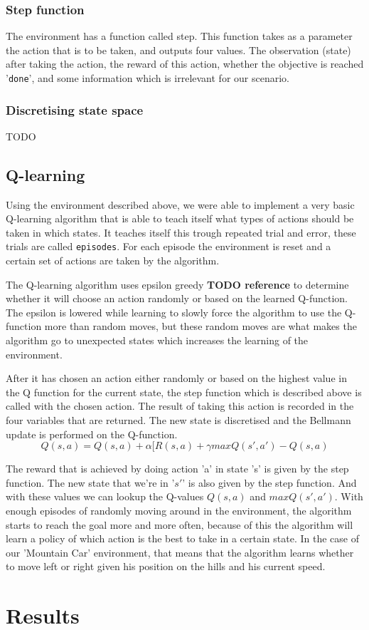 \documentclass{article}
\begin{document}
\subsubsection{Step function}
The environment has a function called step. This function takes as a parameter the action that is to be taken, and outputs four values. The observation (state) after taking the action, the reward of this action, whether the objective is reached '\texttt{done}', and some information which is irrelevant for our scenario. 
\subsubsection{Discretising state space}
TODO 

\subsection{Q-learning}
Using the environment described above, we were able to implement a very basic Q-learning algorithm that is able to teach itself what types of actions should be taken in which states. 
It teaches itself this trough repeated trial and error, these trials are called \texttt{episodes}. For each episode the environment is reset and a certain set of actions are taken by the algorithm. 

The Q-learning algorithm uses epsilon greedy \textbf{TODO reference} to determine whether it will choose an action randomly or based on the learned Q-function. The epsilon is lowered while learning to slowly force the algorithm to use the Q-function more than random moves, but these random moves are what makes the algorithm go to unexpected states which increases the learning of the environment. 

After it has chosen an action either randomly or based on the highest value in the Q function for the current state, the step function which is described above is called with the chosen action. The result of taking this action is recorded in the four variables that are returned. The new state is discretised and the Bellmann update is performed on the Q-function. 
\begin{displaymath}
  Q(s, a) = Q(s,a) + \alpha[R(s,a) + \gamma max Q(s', a') - Q(s, a)
\end{displaymath}

The reward that is achieved by doing action 'a' in state 's' is given by the step function. The new state that we're in '$s'$' is also given by the step function. And with these values we can lookup the Q-values $Q(s, a)$ and $max Q(s', a')$. 
With enough episodes of randomly moving around in the environment, the algorithm starts to reach the goal more and more often, because of this the algorithm will learn a policy of which action is the best to take in a certain state. In the case of our 'Mountain Car' environment, that means that the algorithm learns whether to move left or right given his position on the hills and his current speed.


\section{Results}
\end{document}
